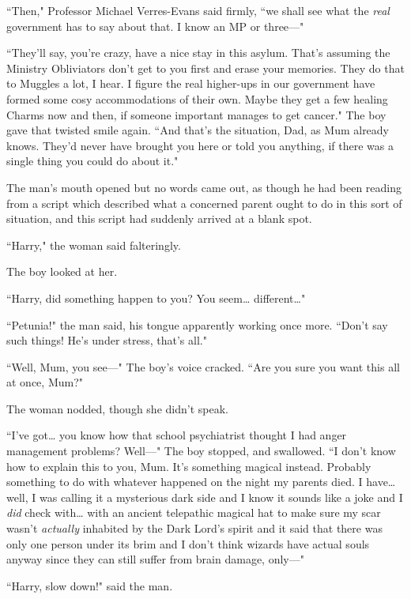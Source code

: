 ``Then," Professor Michael Verres-Evans said firmly, ``we shall see what the \emph{real} government has to say about that. I know an MP or three—"

``They'll say, you're crazy, have a nice stay in this asylum. That's assuming the Ministry Obliviators don't get to you first and erase your memories. They do that to Muggles a lot, I hear. I figure the real higher-ups in our government have formed some cosy accommodations of their own. Maybe they get a few healing Charms now and then, if someone important manages to get cancer." The boy gave that twisted smile again. ``And that's the situation, Dad, as Mum already knows. They'd never have brought you here or told you anything, if there was a single thing you could do about it."

The man's mouth opened but no words came out, as though he had been reading from a script which described what a concerned parent ought to do in this sort of situation, and this script had suddenly arrived at a blank spot.

``Harry," the woman said falteringly.

The boy looked at her.

``Harry, did something happen to you? You seem{\ldots} different{\ldots}"

``Petunia!" the man said, his tongue apparently working once more. ``Don't say such things! He's under stress, that's all."

``Well, Mum, you see—" The boy's voice cracked. ``Are you sure you want this all at once, Mum?"

The woman nodded, though she didn't speak.

``I've got{\ldots} you know how that school psychiatrist thought I had anger management problems? Well—" The boy stopped, and swallowed. ``I don't know how to explain this to you, Mum. It's something magical instead. Probably something to do with whatever happened on the night my parents died. I have{\ldots} well, I was calling it a mysterious dark side and I know it sounds like a joke and I \emph{did} check with{\ldots} with an ancient telepathic magical hat to make sure my scar wasn't \emph{actually} inhabited by the Dark Lord's spirit and it said that there was only one person under its brim and I don't think wizards have actual souls anyway since they can still suffer from brain damage, only—"

``Harry, slow down!" said the man.

